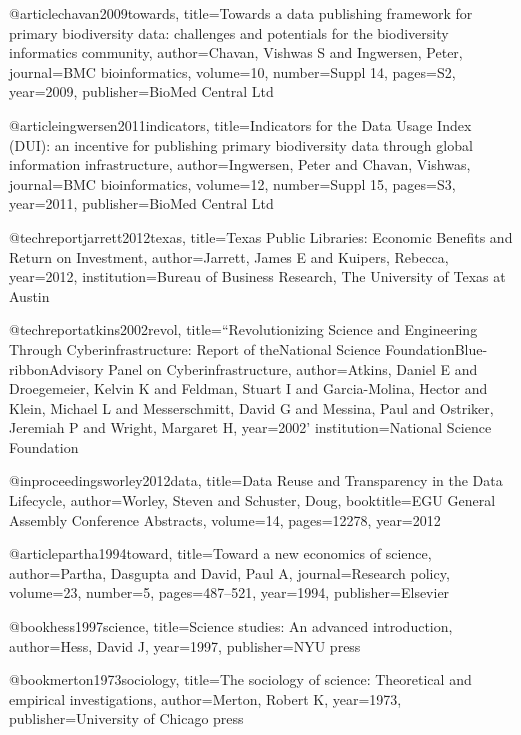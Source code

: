 @article{chavan2009towards,
  title={Towards a data publishing framework for primary biodiversity data: challenges and potentials for the biodiversity informatics community},
  author={Chavan, Vishwas S and Ingwersen, Peter},
  journal={BMC bioinformatics},
  volume={10},
  number={Suppl 14},
  pages={S2},
  year={2009},
  publisher={BioMed Central Ltd}
}


@article{ingwersen2011indicators,
  title={Indicators for the Data Usage Index (DUI): an incentive for publishing primary biodiversity data through global information infrastructure},
  author={Ingwersen, Peter and Chavan, Vishwas},
  journal={BMC bioinformatics},
  volume={12},
  number={Suppl 15},
  pages={S3},
  year={2011},
  publisher={BioMed Central Ltd}
}

@techreport{jarrett2012texas,
  title={Texas Public Libraries: Economic Benefits and Return on Investment},
  author={Jarrett, James E and Kuipers, Rebecca},
  year={2012},
  institution={Bureau of Business Research, The University of Texas at Austin}
}

@techreport{atkins2002revol,
    title={“Revolutionizing Science and
Engineering Through Cyberinfrastructure: Report
of theNational Science FoundationBlue-ribbonAdvisory
Panel on Cyberinfrastructure},
author={Atkins, Daniel E and Droegemeier, Kelvin K and Feldman, Stuart I and Garcia-Molina, Hector and Klein, Michael L and Messerschmitt, David G and Messina, Paul and Ostriker, Jeremiah P and Wright, Margaret H},
    year={2002}'
    institution={National Science Foundation}
}

@inproceedings{worley2012data,
  title={Data Reuse and Transparency in the Data Lifecycle},
  author={Worley, Steven and Schuster, Doug},
  booktitle={EGU General Assembly Conference Abstracts},
  volume={14},
  pages={12278},
  year={2012}
}

@article{partha1994toward,
  title={Toward a new economics of science},
  author={Partha, Dasgupta and David, Paul A},
  journal={Research policy},
  volume={23},
  number={5},
  pages={487--521},
  year={1994},
  publisher={Elsevier}
}

@book{hess1997science,
  title={Science studies: An advanced introduction},
  author={Hess, David J},
  year={1997},
  publisher={NYU press}
}


@book{merton1973sociology,
  title={The sociology of science: Theoretical and empirical investigations},
  author={Merton, Robert K},
  year={1973},
  publisher={University of Chicago press}
}


